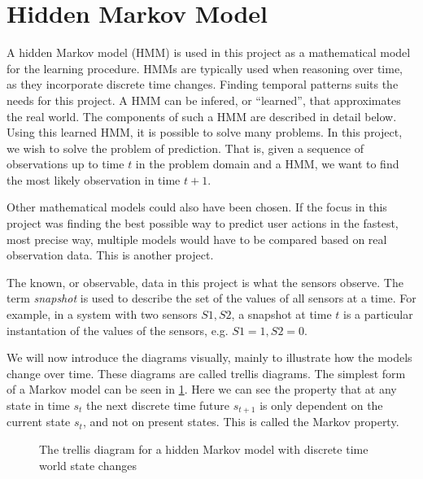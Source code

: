 \section{Hidden Markov Model}
A hidden Markov model (HMM) is used in this project as a mathematical model for the learning procedure. HMMs are typically used when reasoning over time, as they incorporate discrete time changes. Finding temporal patterns suits the needs for this project. A HMM can be infered, or \enquote{learned}, that approximates the real world. The components of such a HMM are described in detail below. Using this learned HMM, it is possible to solve many problems. In this project, we wish to solve the problem of prediction. That is, given a sequence of observations up to time $t$ in the problem domain and a HMM, we want to find the most likely observation in time $t+1$.

Other mathematical models could also have been chosen. If the focus in this project was finding the best possible way to predict user actions in the fastest, most precise way, multiple models would have to be compared based on real observation data. This is another project.

The known, or observable, data in this project is what the sensors observe. The term \emph{snapshot} is used to describe the set of the values of all sensors at a time. For example, in a system with two sensors $S1,S2$, a snapshot at time $t$ is a particular instantation of the values of the sensors, e.g. $S1=1, S2=0$.

We will now introduce the diagrams visually, mainly to illustrate how the models change over time. These diagrams are called trellis diagrams. The simplest form of a Markov model can be seen in \cref{fig:1stMarkovModel}. Here we can see the property that at any state in time $s_t$ the next discrete time future $s_{t+1}$ is only dependent on the current state $s_t$, and not on present states. This is called the Markov property.

\begin{figure}[htbp]
\centering
{}
\caption[Trellis diagram for a simple Markov model]{The trellis diagram for a hidden Markov model with discrete time world state changes}\label{fig:1stMarkovModel}
\end{figure}

